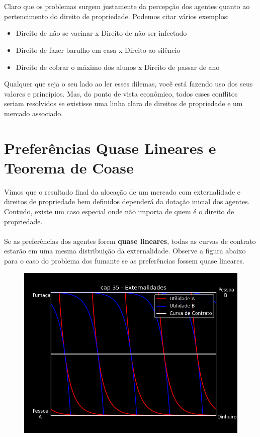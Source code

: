 \documentclass[a4paper,11pt,oneside]{book}
\theoremstyle{definition}
\theoremstyle{break}
\begin{document}
\\~\\
Claro que os problemas surgem justamente da percepção dos agentes quanto ao pertencimento do direito de propriedade. Podemos citar vários exemplos:
\begin{itemize}
	\item Direito de não se vacinar x Direito de não ser infectado
	\item Direito de fazer barulho em casa x Direito ao silêncio
	\item Direito de cobrar o máximo dos alunos x Direito de passar de ano
\end{itemize}

Qualquer que seja o seu lado ao ler esses dilemas, você está fazendo uso dos seus valores e princípios. Mas, do ponto de vista econômico, todos esses conflitos seriam resolvidos se existisse uma linha clara de direitos de propriedade e um mercado associado.

\section{Preferências Quase Lineares e Teorema de Coase}

Vimos que o resultado final da alocação de um mercado com externalidade e direitos de propriedade bem definidos dependerá da dotação inicial dos agentes. Contudo, existe um caso especial onde não importa de quem é o direito de propriedade.
\\~\\
Se as preferências dos agentes forem \textbf{quase lineares}, todas as curvas de contrato estarão em uma mesma distribuição da externalidade. Observe a figura abaixo para o caso do problema dos fumante se as preferências fossem quase lineares.

\begin{figure}[H]
	\centering
	\includegraphics[scale=0.8]{cap35_2-teorema_coase.png}
\end{figure}
\end{document}
